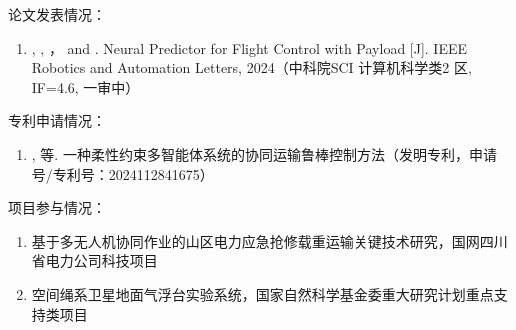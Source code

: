 \documentclass[lang=chs, degree=master, blindreview=true, winfonts=true]{yanputhesis}
\begin{document}
\begin{accomplishments}                                     %
	论文发表情况：
	\begin{enumerate}
		\item {}, , ，  and . Neural Predictor for Flight Control with Payload [J].  IEEE Robotics
		and Automation Letters, 2024（中科院SCI 计算机科学类2 区, IF=4.6, 一审中）
	\end{enumerate}

    专利申请情况：
    \begin{enumerate}
    	\item {}, 等. 一种柔性约束多智能体系统的协同运输鲁棒控制方法（发明专利，申请号/专利号：2024112841675）
    \end{enumerate}

	项目参与情况：
    \begin{enumerate}

    	\item 基于多无人机协同作业的山区电力应急抢修载重运输关键技术研究，国网四川省电力公司科技项目
    	\item 空间绳系卫星地面气浮台实验系统，国家自然科学基金委重大研究计划重点支持类项目
    \end{enumerate}
\end{accomplishments}                                       %
\makestatement                                              %
\end{document}
